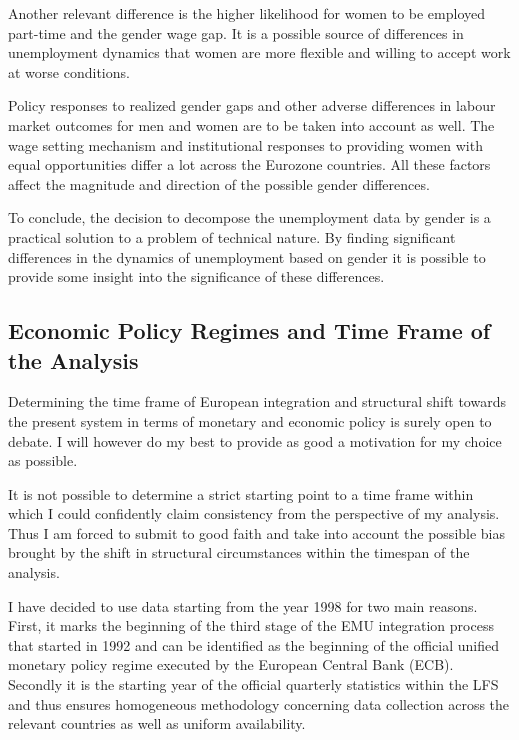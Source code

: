 \documentclass[12pt,a4paper,english]{article}
\begin{document}
Another relevant difference is the higher likelihood for women to be employed part-time and the gender wage gap. It is a possible source of differences in unemployment dynamics that women are more flexible and willing to accept work at worse conditions. \citep{arulampalam2007}

Policy responses to realized gender gaps and other adverse differences in labour market outcomes for men and women are to be taken into account as well. The wage setting mechanism and institutional responses to providing women with equal opportunities differ a lot across the Eurozone countries. All these factors affect the magnitude and direction of the possible gender differences. \citep{blau2003}

To conclude, the decision to decompose the unemployment data by gender is a practical solution to a problem of technical nature. By finding significant differences in the dynamics of unemployment based on gender it is possible to provide some insight into the significance of these differences.

\vspace{2cm}

\subsection{Economic Policy Regimes and Time Frame of the Analysis}

Determining the time frame of European integration and structural shift towards the present system in terms of monetary and economic policy is surely open to debate. I will however do my best to provide as good a motivation for my choice as possible.

It is not possible to determine a strict starting point to a time frame within which I could confidently claim consistency from the perspective of my analysis. Thus I am forced to submit to good faith and take into account the possible bias brought by the shift in structural circumstances within the timespan of the analysis.

I have decided to use data starting from the year 1998 for two main reasons. First, it marks the beginning of the third stage of the EMU integration process that started in 1992 and can be identified as the beginning of the official unified monetary policy regime executed by the European Central Bank (ECB). Secondly it is the starting year of the official quarterly statistics within the LFS and thus ensures homogeneous methodology concerning data collection across the relevant countries as well as uniform availability.
\end{document}
